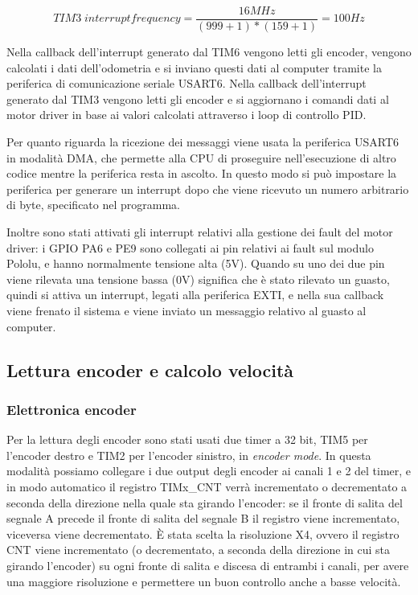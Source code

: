 \begin{displaymath}
TIM3 \; interrupt frequency = \frac{16 MHz}{(999 + 1)*(159 + 1)} = 100 Hz
\end{displaymath}

Nella callback dell'interrupt generato dal TIM6 vengono letti gli encoder, vengono calcolati i dati dell'odometria e si inviano questi dati al computer tramite la periferica di comunicazione seriale USART6.
Nella callback dell'interrupt generato dal TIM3 vengono letti gli encoder e si aggiornano i comandi dati al motor driver in base ai valori calcolati attraverso i loop di controllo PID.

Per quanto riguarda la ricezione dei messaggi viene usata la periferica USART6 in modalità DMA, che permette alla CPU di proseguire nell'esecuzione di altro codice mentre la periferica resta in ascolto. In questo modo si può impostare la periferica per generare un interrupt dopo che viene ricevuto un numero arbitrario di byte, specificato nel programma.

Inoltre sono stati attivati gli interrupt relativi alla gestione dei fault del motor driver: i GPIO PA6 e PE9 sono collegati ai pin relativi ai fault sul modulo Pololu, e hanno normalmente tensione alta (5V). Quando su uno dei due pin viene rilevata una tensione bassa (0V) significa che è stato rilevato un guasto, quindi si attiva un interrupt, legati alla periferica EXTI, e nella sua callback viene frenato il sistema e viene inviato un messaggio relativo al guasto al computer.

\subsection{Lettura encoder e calcolo velocità}

\subsubsection{Elettronica encoder}

Per la lettura degli encoder sono stati usati due timer a 32 bit, TIM5 per l'encoder destro e TIM2 per l'encoder sinistro, in \textit{encoder mode}.
In questa modalità possiamo collegare i due output degli encoder ai canali 1 e 2 del timer, e in modo automatico il registro TIMx\_CNT verrà incrementato o decrementato a seconda della direzione nella quale sta girando l'encoder: se il fronte di salita del segnale A precede il fronte di salita del segnale B il registro viene incrementato, viceversa viene decrementato. È stata scelta la risoluzione X4, ovvero il registro CNT viene incrementato (o decrementato, a seconda della direzione in cui sta girando l'encoder) su ogni fronte di salita e discesa di entrambi i canali, per avere una maggiore risoluzione e permettere un buon controllo anche a basse velocità.

